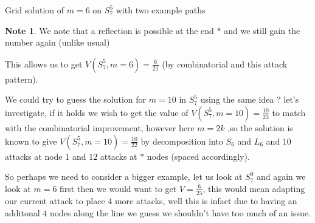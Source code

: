\documentclass[a4paper,10pt]{article}
\theoremstyle{definition}
\theoremstyle{definition}
\theoremstyle{remark}
\theoremstyle{definition}
\newtheorem*{note}{Note}
\begin{document}
\begin{myfigure}
\begin{center}
\end{center}
\caption{Grid solution of $m=6$ on $S_{7}^{5}$ with two example paths}
\end{myfigure}

\begin{note}
We note that a reflection is possible at the end $*$ and we still gain the number again (unlike usual)
\end{note}

This allows us to get $V(S_{7}^{5},m=6)=\frac{6}{21}$ (by combinatorial and this attack pattern).

We could try to guess the solution for $m=10$ in $S_{7}^{5}$ using the same idea ? let's investigate, if it holds we wish to get the value of $V(S_{7}^{5},m=10)=\frac{10}{23}$ to match with the combinatorial improvement, however here $m=2k$ ,so the solution is known to give $V(S_{7}^{5},m=10)=\frac{10}{22}$ by decomposition into $S_{6}$ and $L_{6}$ and $10$ attacks at node $1$ and $12$ attacks at $*$ nodes (spaced accordingly).

So perhaps we need to consider a bigger example, let us look at $S_{7}^{9}$ and again we look at $m=6$ first then we would want to get $V=\frac{6}{25}$, this would mean adapting our current attack to place $4$ more attacks, well this is infact due to having an additonal $4$ nodes along the line we guess we shouldn't have too much of an issue.
\end{document}
